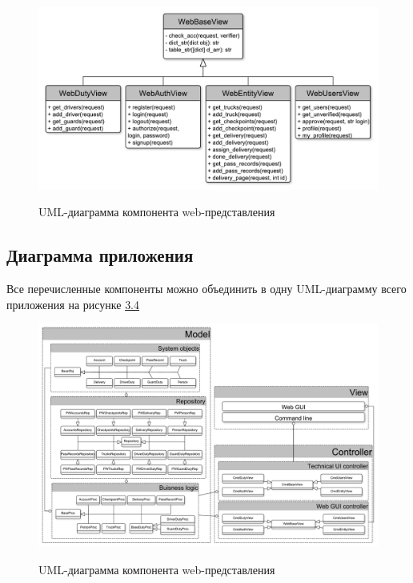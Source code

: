 \begin{figure}[h!] \label{view_pic}
	\begin{center}
		{\includegraphics[scale=0.5, angle=0]{uml/webGUI.pdf}}
		\caption{UML-диаграмма компонента web-представления}
	\end{center}
\end{figure}

\newpage
\subsection{Диаграмма приложения}
Все перечисленные компоненты можно объединить в одну UML-диаграмму всего приложения на рисунке \hyperref[alluml_pic]{3.4}

\begin{figure}[h!] \label{alluml_pic}
	\begin{center}
		{\includegraphics[scale=0.36, angle=-90]{uml/components.pdf}}
		\caption{UML-диаграмма компонента web-представления}
	\end{center}
\end{figure}


